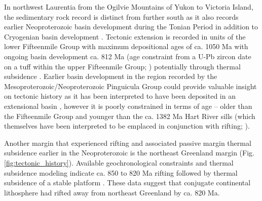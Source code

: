 \documentclass[11pt,letterpaper]{article}
\begin{document}
In northwest Laurentia from the Ogilvie Mountains of Yukon to Victoria Island, the sedimentary rock record is distinct from further south as it also records earlier Neoproterozoic basin development during the Tonian Period in addition to Cryogenian basin development \citep{Macdonald2012a}. Tectonic extension is recorded in units of the lower Fifteenmile Group with maximum depositional ages of ca. 1050 Ma with ongoing basin development ca. 812 Ma (age constraint from a U-Pb zircon date on a tuff within the upper Fifteenmile Group; \citealp{Macdonald2010a}) potentially through thermal subsidence \citep{Macdonald2012a}. Earlier basin development in the region recorded by the Mesoproterozoic/Neoproterozoic Pinguicula Group could provide valuable insight on tectonic history as it has been interpreted to have been deposited in an extensional basin \citep{Medig2016a}, however it is poorly constrained in terms of age -- older than the Fifteenmile Group and younger than the ca. 1382 Ma Hart River sills (which themselves have been interpreted to be emplaced in conjunction with rifting; \citealp{Verbaas2018a}).

Another margin that experienced rifting and associated passive margin thermal subsidence earlier in the Neoproterozoic is the northeast Greenland margin (Fig. \ref{fig:tectonic_history}). Available geochronological constraints and thermal subsidence modeling indicate ca. 850 to 820 Ma rifting followed by thermal subsidence of a stable platform \citep{Maloof2006a, Halverson2018a}. These data suggest that conjugate continental lithosphere had rifted away from northeast Greenland by ca. 820 Ma.
\end{document}
